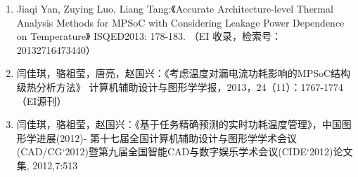 \begin{paper}

\begin{enumerate}
	

	\item Jiaqi Yan, Zuying Luo, Liang Tang:《Accurate Architecture-level Thermal Analysis Methods for MPSoC with Considering Leakage Power Dependence on Temperature》 ISQED2013: 178-183. （EI 收录，检索号：20132716473440）
	\item 闫佳琪，骆祖莹，唐亮，赵国兴：《考虑温度对漏电流功耗影响的MPSoC结构级热分析方法》 计算机辅助设计与图形学学报，2013，24（11）：1767-1774 （EI源刊）
	\item 闫佳琪，骆祖莹，赵国兴：《基于任务精确预测的实时功耗温度管理》，中国图形学进展(2012)- 第十七届全国计算机辅助设计与图形学学术会议(CAD/CG`2012)暨第九届全国智能CAD与数字娱乐学术会议(CIDE`2012)论文集, 2012,7:513

\end{enumerate}

\end{paper}
